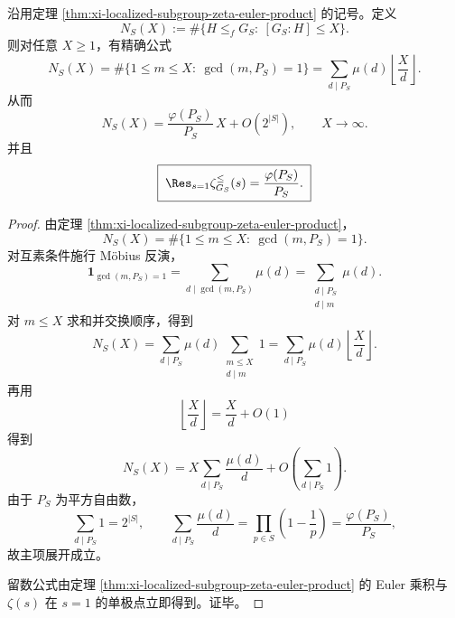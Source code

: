 \begin{corollary}\label{cor:xi-localized-subgroup-counting-main-term}
沿用定理 \ref{thm:xi-localized-subgroup-zeta-euler-product} 的记号。定义
\[
N_S(X)
:=
\#\{H\le_f G_S:\ [G_S:H]\le X\}.
\]
则对任意 \(X\ge 1\)，有精确公式
\[
N_S(X)
=
\#\{1\le m\le X:\ \gcd(m,P_S)=1\}
=
\sum_{d\mid P_S}\mu(d)\left\lfloor\frac{X}{d}\right\rfloor.
\]
从而
\[
\boxed{\;
N_S(X)
=
\frac{\varphi(P_S)}{P_S}\,X+O(2^{|S|}),
\qquad
X\to\infty.\;}
\]
并且
\[
\boxed{\;
\Res_{s=1}\zeta_{G_S}^{\le}(s)
=
\frac{\varphi(P_S)}{P_S}.\;}
\]
\end{corollary}
\begin{proof}
由定理 \ref{thm:xi-localized-subgroup-zeta-euler-product}，
\[
N_S(X)=\#\{1\le m\le X:\ \gcd(m,P_S)=1\}.
\]
对互素条件施行 Möbius 反演，
\[
\mathbf 1_{\gcd(m,P_S)=1}
=
\sum_{d\mid \gcd(m,P_S)}\mu(d)
=
\sum_{\substack{d\mid P_S\\ d\mid m}}\mu(d).
\]
对 \(m\le X\) 求和并交换顺序，得到
\[
N_S(X)
=
\sum_{d\mid P_S}\mu(d)\sum_{\substack{m\le X\\ d\mid m}}1
=
\sum_{d\mid P_S}\mu(d)\left\lfloor\frac{X}{d}\right\rfloor.
\]
再用
\[
\left\lfloor\frac{X}{d}\right\rfloor=\frac{X}{d}+O(1)
\]
得到
\[
N_S(X)
=
X\sum_{d\mid P_S}\frac{\mu(d)}{d}
+O\!\left(\sum_{d\mid P_S}1\right).
\]
由于 \(P_S\) 为平方自由数，
\[
\sum_{d\mid P_S}1=2^{|S|},
\qquad
\sum_{d\mid P_S}\frac{\mu(d)}{d}
=
\prod_{p\in S}\left(1-\frac1p\right)
=
\frac{\varphi(P_S)}{P_S},
\]
故主项展开成立。

留数公式由定理 \ref{thm:xi-localized-subgroup-zeta-euler-product} 的 Euler 乘积与 \(\zeta(s)\) 在 \(s=1\) 的单极点立即得到。证毕。
\end{proof}

